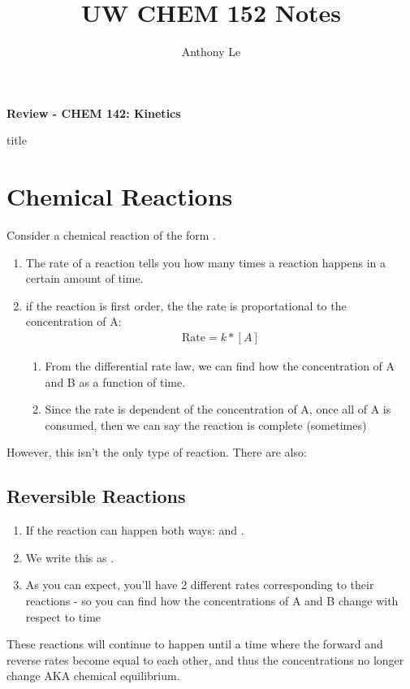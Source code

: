 \documentclass{article}  %
\title{UW CHEM 152 Notes}
\author{Anthony Le}
\begin{document}
\pagestyle{fancy}
\fancyhead{}
\fancyfoot[L]{\thepage}

\begin{center}
    \LARGE{\textbf{Review - CHEM 142: Kinetics}}
\end{center}
title
\section*{Chemical Reactions}
Consider a chemical reaction of the form .
\begin{enumerate}
    \item The rate of a reaction tells you how many times a reaction happens in a certain amount of time.
    \item if the reaction  is first order, the the rate is proportational to the concentration of A: 
    \begin{equation*}
        \begin{aligned}
            \text{Rate} = k * [A]    
        \end{aligned}
    \end{equation*}
    \begin{enumerate}
        \item From the differential rate law, we can find how the concentration of A and B as a function of time. 
        \item Since the rate is dependent of the concentration of A, once all of A is consumed, then we can say the reaction is complete (sometimes)
    \end{enumerate} 
\end{enumerate}

However, this isn't the only type of reaction. There are also:
\subsection*{Reversible Reactions}
\begin{enumerate}
    \item If the reaction can happen both ways:  and . 
    \item We write this as . 
    \item As you can expect, you'll have 2 different rates corresponding to their reactions - so you can find how the concentrations of A and B change with respect to time
\end{enumerate}
These reactions will continue to happen until a time where the forward and reverse rates become equal to each other, and thus the concentrations no longer change AKA chemical equilibrium.
\end{document}
